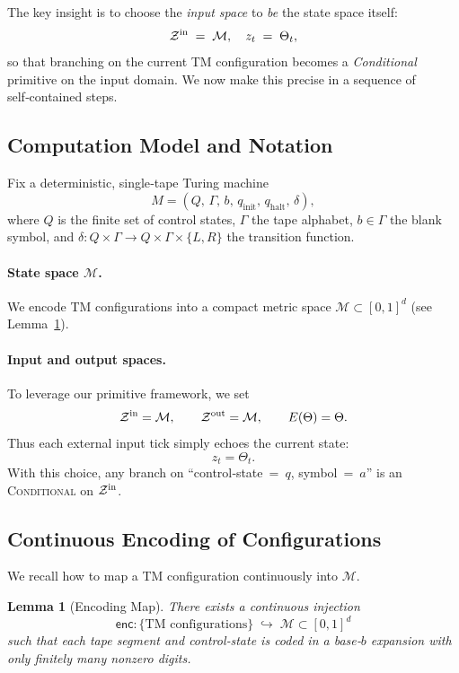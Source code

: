 \documentclass[12pt]{article}
\theoremstyle{definition}
\theoremstyle{plain}
\newtheorem{lemma}{Lemma}[section]
\begin{document}
The key insight is to choose the \emph{input space} to \emph{be} the state space itself:
\[
  \mathcal Z^{\rm in} \;=\; \mathcal M,
  \quad
  z_t \;=\; \Theta_t,
\]
so that branching on the current TM configuration becomes a \emph{Conditional} primitive on the input domain.  We now make this precise in a sequence of self‑contained steps.

\subsection{Computation Model and Notation}
\label{subsec:tm-model}

Fix a deterministic, single‑tape Turing machine
\[
  M = (Q,\,\Gamma,\,b,\,q_{\mathrm{init}},\,q_{\mathrm{halt}},\,\delta),
\]
where \(Q\) is the finite set of control states, \(\Gamma\) the tape alphabet, \(b\in\Gamma\) the blank symbol, and
\(\delta:Q\times\Gamma\to Q\times\Gamma\times\{L,R\}\) the transition function.

\paragraph{State space \(\mathcal M\).}
We encode TM configurations into a compact metric space
\(\mathcal M\subset[0,1]^d\) (see Lemma \ref{lem:encoding}).

\paragraph{Input and output spaces.}
To leverage our primitive framework, we set
\[
  \mathcal Z^{\rm in} = \mathcal M,
  \qquad
  \mathcal Z^{\rm out} = \mathcal M,
  \qquad
  E(\Theta) = \Theta.
\]
Thus each external input tick simply echoes the current state:
\[
  z_t = \Theta_t.
\]
With this choice, any branch on “control‑state = \(q\), symbol = \(a\)” is an \textsc{Conditional} on \(\mathcal Z^{\rm in}\).

\subsection{Continuous Encoding of Configurations}
\label{subsec:encoding}

We recall how to map a TM configuration continuously into \(\mathcal M\).

\begin{lemma}[Encoding Map]
\label{lem:encoding}
There exists a continuous injection
\[
  \mathsf{enc}:\{\text{TM configurations}\}\;\hookrightarrow\;\mathcal M\subset[0,1]^d
\]
such that each tape segment and control‑state is coded in a base‑\(b\) expansion with only finitely many nonzero digits.
\end{lemma}
\end{document}
